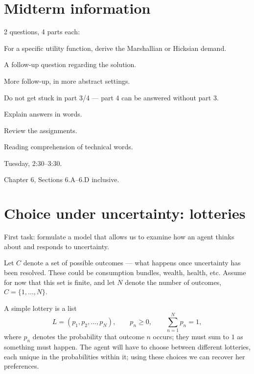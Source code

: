 \documentclass[11pt]{article}
\begin{document}


\section{Midterm information}

 2 questions, 4 parts each:
\begin{flatnum}
  \item For a specific utility function, derive the Marshallian or Hicksian demand.
  \item A follow-up question regarding the solution.
  \item[3--4.] More follow-up, in more abstract settings.
\end{flatnum}

\begin{flatlist}
  \item Do not get stuck in part 3/4 --- part 4 can be answered without part 3.
  \item Explain answers in words.
  \item Review the assignments.
  \item Reading comprehension of technical words.
\end{flatlist}

 Tuesday, 2:30--3:30.

 Chapter 6, Sections 6.A--6.D inclusive.


\section{Choice under uncertainty: lotteries}

First task: formulate a model that allows us to examine how an agent thinks about
and responds to uncertainty.

Let $C$ denote a set of possible outcomes --- what happens once uncertainty has been
resolved. These could be consumption bundles, wealth, health, etc. Assume for now
that this set is finite, and let $N$ denote the number of outcomes,
$C=\{1,\dots,N\}$.

A simple lottery is a list
\[ L=(p_1,p_2,\dots,p_N),\qquad p_n\ge 0,\qquad \sum_{n=1}^{N}p_n=1, \]
where $p_n$ denotes the probability that outcome $n$ occurs; they must sum to $1$ as
something must happen. The agent will have to choose between different lotteries,
each unique in the probabilities within it; using these choices we can recover her
preferences.
\end{document}
